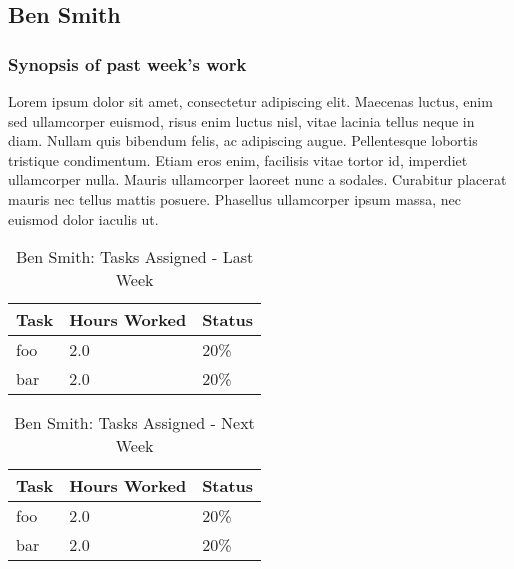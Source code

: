 \documentclass[12pt,article,compsoc]{IEEEtran}
\begin{document}
\subsection{Ben Smith}

	\subsubsection*{Synopsis of past week's work}

	Lorem ipsum dolor sit amet, consectetur adipiscing elit. Maecenas luctus, enim sed ullamcorper euismod, risus enim luctus nisl, vitae lacinia tellus neque in diam. Nullam quis bibendum felis, ac adipiscing augue. Pellentesque lobortis tristique condimentum. Etiam eros enim, facilisis vitae tortor id, imperdiet ullamcorper nulla. Mauris ullamcorper laoreet nunc a sodales. Curabitur placerat mauris nec tellus mattis posuere. Phasellus ullamcorper ipsum massa, nec euismod dolor iaculis ut.


	\begin{table}[ht]
	\renewcommand{\arraystretch}{1.3}
		\caption{Ben Smith: Tasks Assigned - Last Week}
		
		\label{Summary of Ben Smith's activities: last week}
		
		\centering
		\begin{tabular}{p{5.5cm}|p{1cm}|p{1cm}}

		\hline
		\bfseries 		Task					& \bfseries Hours Worked		& \bfseries Status	\\
		\hline\hline
					foo					& 2.0						& 20\%				\\	%
					bar					& 2.0						& 20\%				\\	
		\hline
		\end{tabular}
	\end{table}

	\begin{table}[ht]
	\renewcommand{\arraystretch}{1.3}
		\caption{Ben Smith: Tasks Assigned - Next Week}
		
		\label{Summary of Ben Smith's activites: this week}
		
		\centering
		\begin{tabular}{p{5.5cm}|p{1cm}|p{1cm}}

		\hline
		\bfseries 	Task		 		& \bfseries Hours Worked	& \bfseries Status	\\
		\hline\hline
					foo					& 2.0						& 20\%				\\	%
					bar					& 2.0						& 20\%				\\	
		\hline
		\end{tabular}
	\end{table}
\end{document}
